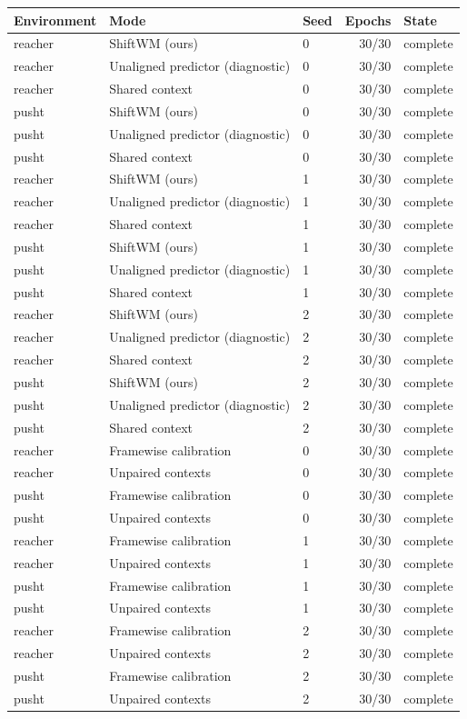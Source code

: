 \begin{longtable}{lllrl}
\toprule Environment & Mode & Seed & Epochs & State\\\midrule\endhead
reacher & ShiftWM (ours) & 0 & 30/30 & complete\\
reacher & Unaligned predictor (diagnostic) & 0 & 30/30 & complete\\
reacher & Shared context & 0 & 30/30 & complete\\
pusht & ShiftWM (ours) & 0 & 30/30 & complete\\
pusht & Unaligned predictor (diagnostic) & 0 & 30/30 & complete\\
pusht & Shared context & 0 & 30/30 & complete\\
reacher & ShiftWM (ours) & 1 & 30/30 & complete\\
reacher & Unaligned predictor (diagnostic) & 1 & 30/30 & complete\\
reacher & Shared context & 1 & 30/30 & complete\\
pusht & ShiftWM (ours) & 1 & 30/30 & complete\\
pusht & Unaligned predictor (diagnostic) & 1 & 30/30 & complete\\
pusht & Shared context & 1 & 30/30 & complete\\
reacher & ShiftWM (ours) & 2 & 30/30 & complete\\
reacher & Unaligned predictor (diagnostic) & 2 & 30/30 & complete\\
reacher & Shared context & 2 & 30/30 & complete\\
pusht & ShiftWM (ours) & 2 & 30/30 & complete\\
pusht & Unaligned predictor (diagnostic) & 2 & 30/30 & complete\\
pusht & Shared context & 2 & 30/30 & complete\\
reacher & Framewise calibration & 0 & 30/30 & complete\\
reacher & Unpaired contexts & 0 & 30/30 & complete\\
pusht & Framewise calibration & 0 & 30/30 & complete\\
pusht & Unpaired contexts & 0 & 30/30 & complete\\
reacher & Framewise calibration & 1 & 30/30 & complete\\
reacher & Unpaired contexts & 1 & 30/30 & complete\\
pusht & Framewise calibration & 1 & 30/30 & complete\\
pusht & Unpaired contexts & 1 & 30/30 & complete\\
reacher & Framewise calibration & 2 & 30/30 & complete\\
reacher & Unpaired contexts & 2 & 30/30 & complete\\
pusht & Framewise calibration & 2 & 30/30 & complete\\
pusht & Unpaired contexts & 2 & 30/30 & complete\\
\bottomrule\end{longtable}
